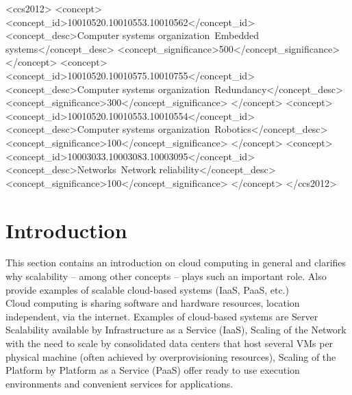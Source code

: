 \documentclass[sigconf]{acmart}
\begin{document}
\begin{CCSXML}
<ccs2012>
 <concept>
  <concept_id>10010520.10010553.10010562</concept_id>
  <concept_desc>Computer systems organization~Embedded systems</concept_desc>
  <concept_significance>500</concept_significance>
 </concept>
 <concept>
  <concept_id>10010520.10010575.10010755</concept_id>
  <concept_desc>Computer systems organization~Redundancy</concept_desc>
  <concept_significance>300</concept_significance>
 </concept>
 <concept>
  <concept_id>10010520.10010553.10010554</concept_id>
  <concept_desc>Computer systems organization~Robotics</concept_desc>
  <concept_significance>100</concept_significance>
 </concept>
 <concept>
  <concept_id>10003033.10003083.10003095</concept_id>
  <concept_desc>Networks~Network reliability</concept_desc>
  <concept_significance>100</concept_significance>
 </concept>
</ccs2012>
\end{CCSXML}



\maketitle

\section{Introduction}
This section contains an introduction on cloud computing
in general and clarifies why scalability – among other
concepts – plays such an important role. Also provide examples
of scalable cloud-based systems (IaaS, PaaS, etc.) \\
Cloud computing is sharing software and hardware resources,
location independent, via the internet. Examples of cloud-based
systems are Server Scalability available by Infrastructure as a
Service (IaaS), Scaling of the Network with the need to scale
by consolidated data centers that host several VMs per physical
machine (often achieved by overprovisioning resources),
Scaling of the Platform by Platform as a Service (PaaS) offer
ready to use execution environments and convenient services
for applications.
\end{document}
